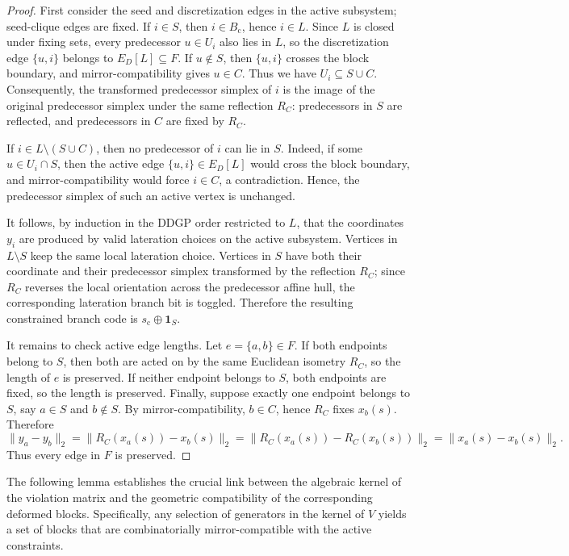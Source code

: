 \begin{proof}
First consider the seed and discretization edges in the active subsystem; seed-clique edges are fixed. If $i\in S$, then $i\in B_{\mathrm{c}}$, hence $i\in L$. Since $L$ is closed under fixing sets, every predecessor $u\in U_i$ also lies in $L$, so the discretization edge $\{u,i\}$ belongs to $E_D[L]\subseteq F$. If $u\notin S$, then $\{u,i\}$ crosses the block boundary, and mirror-compatibility gives $u\in C$. Thus we have $U_i\subseteq S\cup C$. Consequently, the transformed predecessor simplex of $i$ is the image of the original predecessor simplex under the same reflection $R_C$: predecessors in $S$ are reflected, and predecessors in $C$ are fixed by $R_C$.

If $i\in L\setminus (S\cup C)$, then no predecessor of $i$ can lie in $S$. Indeed, if some $u\in U_i\cap S$, then the active edge $\{u,i\}\in E_D[L]$ would cross the block boundary, and mirror-compatibility would force $i\in C$, a contradiction. Hence, the predecessor simplex of such an active vertex is unchanged.

It follows, by induction in the DDGP order restricted to $L$, that the coordinates $y_i$ are produced by valid lateration choices on the active subsystem. Vertices in $L\setminus S$ keep the same local lateration choice. Vertices in $S$ have both their coordinate and their predecessor simplex transformed by the reflection $R_C$; since $R_C$ reverses the local orientation across the predecessor affine hull, the corresponding lateration branch bit is toggled. Therefore the resulting constrained branch code is $s_{\mathrm{c}}\oplus \mathbf{1}_S$.

It remains to check active edge lengths. Let $e=\{a,b\}\in F$. If both endpoints belong to $S$, then both are acted on by the same Euclidean isometry $R_C$, so the length of $e$ is preserved. If neither endpoint belongs to $S$, both endpoints are fixed, so the length is preserved. Finally, suppose exactly one endpoint belongs to $S$, say $a\in S$ and $b\notin S$. By mirror-compatibility, $b\in C$, hence $R_C$ fixes $x_b(s)$. Therefore
\[
\|y_a-y_b\|_2
=
\|R_C(x_a(s))-x_b(s)\|_2
=
\|R_C(x_a(s))-R_C(x_b(s))\|_2
=
\|x_a(s)-x_b(s)\|_2.
\]
Thus every edge in $F$ is preserved.
\end{proof}

The following lemma establishes the crucial link between the algebraic kernel of the violation matrix and the geometric compatibility of the corresponding deformed blocks. Specifically, any selection of generators in the kernel of $V$ yields a set of blocks that are combinatorially mirror-compatible with the active constraints.

